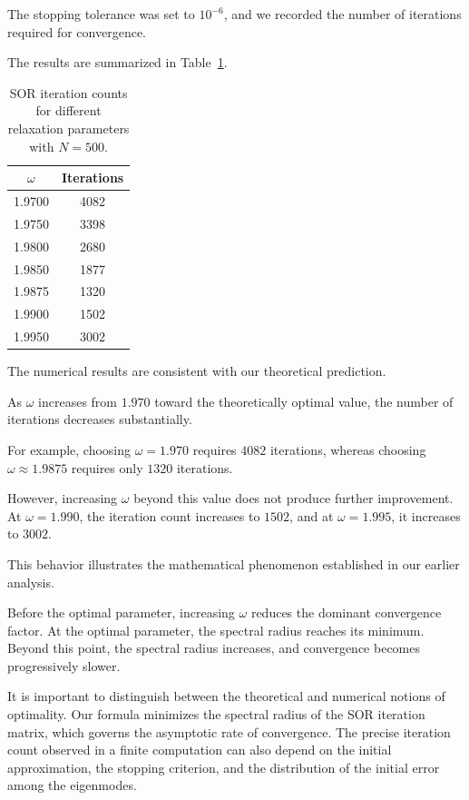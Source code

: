 \documentclass[11pt,a4paper]{article}
\theoremstyle{definition}
\theoremstyle{remark}
\begin{document}
The stopping tolerance was set to
$10^{-6}$, and we recorded the number
of iterations required for convergence.

The results are summarized in
Table~\ref{tab:sor_numerical_results}.

\begin{table}[htbp]
\centering
\caption{SOR iteration counts for different
relaxation parameters with $N=500$.}
\label{tab:sor_numerical_results}
\begin{tabular}{cc}
\hline
$\omega$ & Iterations \\
\hline
1.9700 & 4082 \\
1.9750 & 3398 \\
1.9800 & 2680 \\
1.9850 & 1877 \\
1.9875 & 1320 \\
1.9900 & 1502 \\
1.9950 & 3002 \\
\hline
\end{tabular}
\end{table}

The numerical results are consistent
with our theoretical prediction.

As $\omega$ increases from $1.970$
toward the theoretically optimal value,
the number of iterations decreases
substantially.

For example, choosing $\omega=1.970$
requires $4082$ iterations, whereas
choosing $\omega\approx1.9875$
requires only $1320$ iterations.

However, increasing $\omega$ beyond
this value does not produce further
improvement. At $\omega=1.990$,
the iteration count increases to
$1502$, and at $\omega=1.995$,
it increases to $3002$.

This behavior illustrates the
mathematical phenomenon established
in our earlier analysis.

Before the optimal parameter,
increasing $\omega$ reduces the
dominant convergence factor. At the
optimal parameter, the spectral
radius reaches its minimum. Beyond
this point, the spectral radius
increases, and convergence becomes
progressively slower.

It is important to distinguish
between the theoretical and numerical
notions of optimality. Our formula
minimizes the spectral radius of the
SOR iteration matrix, which governs
the asymptotic rate of convergence.
The precise iteration count observed
in a finite computation can also
depend on the initial approximation,
the stopping criterion, and the
distribution of the initial error
among the eigenmodes.
\end{document}
